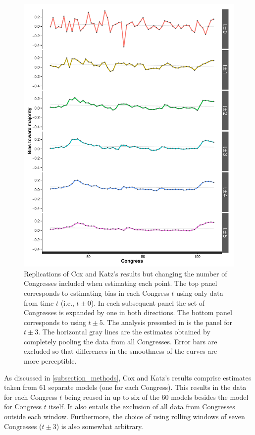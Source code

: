 \begin{figure}
\centering
\includegraphics[scale=0.75]{sections/figs/ck_hypothetical}
\caption{Replications of Cox and Katz's results but changing the number of Congresses included when estimating each point. The top panel corresponds to estimating bias in each Congress $t$ using only data from time $t$ (i.e., $t \pm 0$). In each subsequent panel the set of Congresses is expanded by one in both directions. The bottom panel corresponds to using $t \pm 5$. The analysis presented in \protect{} is the panel for $t \pm 3$. The horizontal gray lines are the estimates obtained by completely pooling the data from all Congresses. Error bars are excluded so that differences in the smoothness of the curves are more perceptible.}
\label{fig:ck_hypothetical}
\end{figure}

As discussed in \ref{subsection_methods}, Cox and Katz's results comprise estimates taken from 61 separate models (one for each Congress). This results in the data for each Congress $t$ being reused in up to six of the 60 models besides the model for Congress $t$ itself. It also entails the exclusion of all data from Congresses outside each window. Furthermore, the choice of using rolling windows of seven Congresses ($t \pm 3$) is also somewhat arbitrary. 

